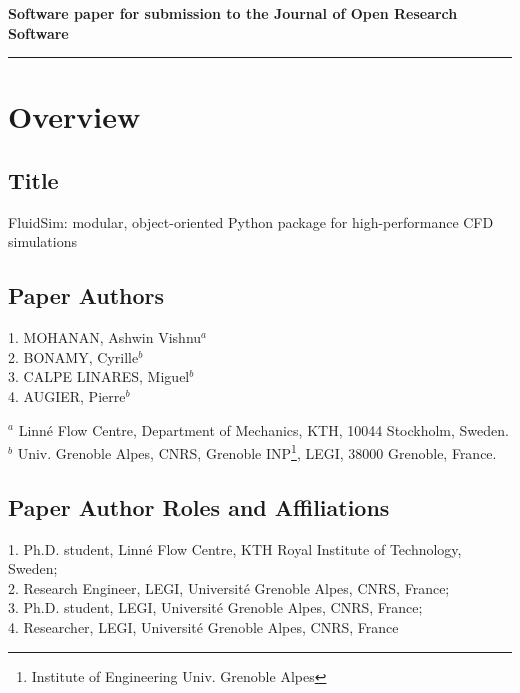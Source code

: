 

{\bf Software paper for submission to the Journal of Open Research Software} \\

\rule{\textwidth}{1pt}

\section{Overview}

\vspace{0.5cm}

\subsection{Title}

FluidSim: modular, object-oriented Python package for high-performance CFD
simulations

\subsection{Paper Authors}

1. MOHANAN, Ashwin Vishnu$^a$ \\
2. BONAMY, Cyrille$^b$ \\
3. CALPE LINARES, Miguel$^b$ \\
4. AUGIER, Pierre$^b$

\smallskip

$^a$ Linn\'e Flow Centre, Department of Mechanics, KTH, 10044 Stockholm, Sweden.\\
$^b$ Univ. Grenoble Alpes, CNRS, Grenoble INP\footnote{Institute of Engineering
Univ. Grenoble Alpes}, LEGI, 38000 Grenoble, France.

\subsection{Paper Author Roles and Affiliations}
1. Ph.D. student, Linn\'e Flow Centre, KTH Royal Institute of Technology,
Sweden; \\
2. Research Engineer, LEGI, Universit\'e Grenoble Alpes, CNRS, France; \\
3. Ph.D. student, LEGI, Universit\'e Grenoble Alpes, CNRS, France; \\
4. Researcher, LEGI, Universit\'e Grenoble Alpes, CNRS, France

